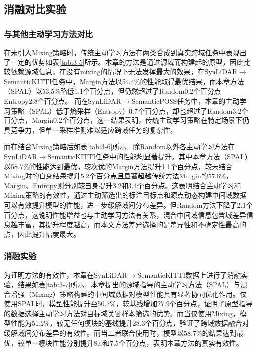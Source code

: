 \subsection{消融对比实验}
\subsubsection{与其他主动学习方法对比}
在未引入Mixing策略时，传统主动学习方法在两类合成到真实跨域任务中表现出了一定的优势如表\ref{tab:3-5}所示。本章的方法是通过源域而构建起的原型，因此比较依赖源域信息，在没有mixing的情况下无法发挥最大的效果，在SynLiDAR$\to$SemanticKITTI任务中，Margin方法以54.4\%的性能取得最优结果，而本章方法（SPAL）以53.5\%略低1.1个百分点，但仍然超过了Random0.2个百分点Entropy2.8个百分点。
而在SynLiDAR$\to$SemanticPOSS任务中，本章的主动学习策略（SPAL）低于熵采样（Entropy）0.7个百分点，却也超过了Random3.2个百分点，Margin0.2个百分点，这一结果表明，传统主动学习策略在特定场景下仍具竞争力，但单一采样准则难以适应跨域任务的复杂性。
\vspace{0.1cm}


而在结合Mixing策略后如表\ref{tab:3-6}所示，除Random以外各主动学习方法在SynLiDAR$\to$SemanticKITTI任务中的性能均显著提升，其中本章方法（SPAL）以58.7\%的性能达到最优，较次优的Margin方法提升1.1个百分点，较未结合Mixing时的自身结果提升5.2个百分点且显著超越传统方法Margin的57.6\%，Margin、Entropy则分别较自身提升3.2和3.4个百分点。这表明结合主动学习和Mixing策略的有效性，通过主动筛选出的标注目标点和源点动态构建中间域数据可以有效提升模型的性能，进一步缓解域间分布差异。但Random方法下降了2.1个百分点，这说明性能增益也与主动学习方法有关系，混合中间域信息包含域差异信息越丰富，其提升程度越高，而本文方法差异选择的是差异性和不确定性最高的点，因此提升幅度最大。
\vspace{0.1cm}


\subsubsection{消融实验}
为证明方法的有效性，本章在SynLiDAR$\to$SemanticKITTI数据上进行了消融实验，结果如表\ref{tab:3-7}所示，本章提出的源域指导的主动学习方法（SPAL）与混合增强（Mixing）策略构建的中间域数据对模型性能具有显著协同优化作用。仅使用SPAL时，模型性能提升至50.7\%，较基线增加27.9个百分点，证明了原型指导的数据选择主动学习方法对目标域关键样本筛选的优势。而当仅使用Mixing，模型性能为51.2\%，较无任何模块的基线提升28.3个百分点，验证了跨域数据融合对缓解域间分布差异的有效性。而当二者联合使用时，模型以58.7\%的结果达到最优，较单一模块性能分别提升8.0和7.5个百分点，表明本章方法的真实有效性。
\vspace{0.1cm}



